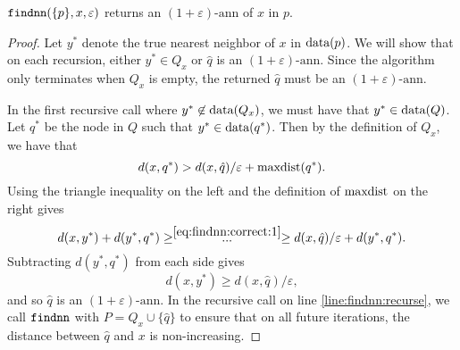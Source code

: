 \documentclass[thesis.tex]{subfiles}
\newcommand{\dist}[2]{\distf({#1},{#2})}
\newcommand{\distf}{d}
\newcommand{\eann}{(1+\varepsilon)\text{-ann}}
\newcommand{\q}{\ensuremath q}
\newcommand{\mkfunction}[1]{\ifmmode{\textnormal{{#1}}}}
\newcommand{\maxdist}[1]    {\mkfunction{maxdist}({#1})}
\newcommand{\data}[1]       {\mkfunction{data}({#1})}
\newcommand{\mkprocedure}[1]{\textnormal{\ttfamily {#1}}}
\newcommand{\findnn}{\mkprocedure{findnn}}
\begin{document}
\begin{theorem}
    \label{theorem:findnn:correct}
    $\findnn(\{p\},x,\varepsilon)$ returns an $\eann$ of $x$ in $p$.
\end{theorem}
\begin{proof}
    Let $y^*$ denote the true nearest neighbor of $x$ in $\data{p}$.
    We will show that on each recursion,
    either $y^* \in Q_x$ or $\hat q$ is an $\eann$.
    Since the algorithm only terminates when $Q_x$ is empty,
    the returned $\hat q$ must be an $\eann$.

    In the first recursive call where $y^* \not\in\data{Q_x}$,
    we must have that $y^* \in \data{Q}$.
    Let $q^*$ be the node in $Q$ such that $y^* \in\data{\q^*}$.
    Then by the definition of $Q_x$, we have that
    \begin{equation}
        \label{eq:findnn:correct:1}
        \dist{x}{q^*}
        > \dist{x}{\hat q}/\varepsilon + \maxdist{q^*} 
        .
    \end{equation}
    Using the triangle inequality on the left and the definition of $\mkfunction{maxdist}$ on the right gives
    \begin{equation}
        \dist{x}{y^*} + \dist{y^*}{q^*} 
        \ge \stackrel{\eqref{eq:findnn:correct:1}}{~~~~...~~~~}
        \ge \dist{x}{\hat q}/\varepsilon + \dist{y^*}{q^*}
        .
    \end{equation}
    Subtracting $\dist{y^*}{q^*}$ from each side gives
    \begin{equation}
        \dist{x}{y^*} \ge \dist{x}{\hat q}/\varepsilon
        ,
    \end{equation}
    and so $\hat q$ is an $\eann$.
    In the recursive call on line \ref{line:findnn:recurse},
    we call $\findnn$ with $P=Q_x\cup\{\hat q\}$ to ensure that on all future iterations,
    the distance between $\hat q$ and $x$ is non-increasing.
\end{proof}
\end{document}
